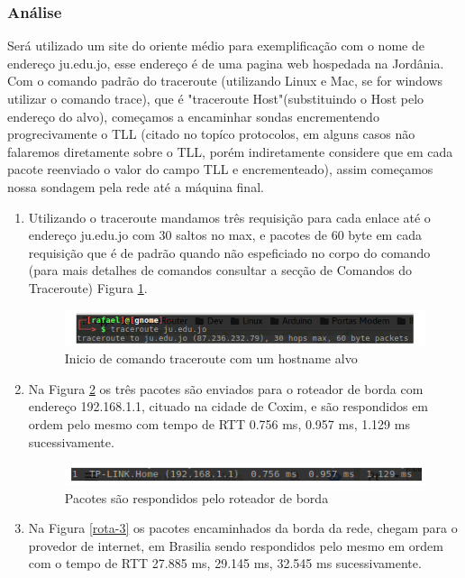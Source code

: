\documentclass[
	article,			%
	11pt,				%
	oneside,			%
	a4paper,			%
	english,			%
	brazil,				%
	sumario=tradicional
	]{abntex2}
\begin{document}
\subsubsection{Análise}
 Será utilizado um site do oriente médio para exemplificação com o nome de endereço ju.edu.jo, esse endereço é de uma pagina web hospedada na Jordânia.
 Com o comando padrão do traceroute (utilizando Linux e Mac, se for  windows utilizar o comando trace), que é "traceroute Host"(substituindo o Host pelo endereço do alvo), começamos a encaminhar sondas encrementendo progrecivamente o TLL (citado no topíco protocolos, em alguns casos não falaremos diretamente sobre o TLL, porém indiretamente considere que em cada pacote reenviado o valor do campo TLL e encrementeado), assim começamos nossa sondagem pela rede até a máquina final. 
 \begin{enumerate}
 	\item
 	Utilizando o traceroute mandamos três requisição para cada enlace até o endereço ju.edu.jo com 30 saltos no max, e pacotes de 60 byte em cada requisição que é de padrão quando não espeficiado no corpo do comando (para mais detalhes de comandos consultar a secção de Comandos do Traceroute) Figura \ref{rota-1}.
 		\begin{figure}[H]
	 		\centering
	 		\includegraphics[scale=0.65]{./rota-1.png}
	 		\caption{Inicio de comando traceroute com um hostname alvo}
	 		\label{rota-1}
	 	\end{figure}
 	
 	\item
 	Na Figura \ref{rota-2} os três pacotes são enviados para o roteador de borda com endereço 192.168.1.1, cituado na cidade de Coxim, e são respondidos em ordem pelo mesmo com tempo de RTT 0.756 ms, 0.957 ms, 1.129 ms sucessivamente.
 	\begin{figure}[H]
 		\centering
 		\includegraphics[scale=0.7]{./rota-2.png}
 		\caption{Pacotes são respondidos pelo roteador de borda}
 		\label{rota-2}
 	\end{figure}
 	
 	\item
 	Na Figura \ref{rota-3} os pacotes encaminhados da borda da rede, chegam para o provedor de internet, em Brasilia sendo respondidos pelo mesmo em ordem com o tempo de RTT 27.885 ms, 29.145 ms, 32.545 ms sucessivamente.	
 	

\end{enumerate}
\end{document}
